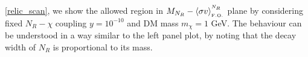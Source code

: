 \documentclass[prd,nofootinbib,preprint,superscriptaddress]{revtex4}
\begin{document}
\ref{relic_scan}, we show the allowed region in $M_{N_R}-\langle\sigma v \rangle^{^{N_R}}_{_{ \rm F.O.}}$ plane by considering fixed $N_R-\chi$ coupling $y=10^{-10}$ and DM mass $m_{\chi}=1$ GeV. The behaviour can be understood in a way similar to the left panel plot, by noting that the decay width of $N_R$ is proportional to its mass. 



\end{document}
